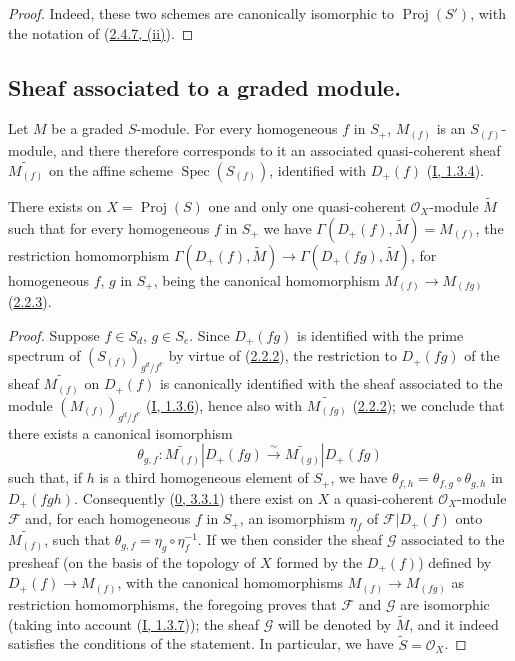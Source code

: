 \begin{proof}
Indeed, these two schemes are canonically isomorphic to
$\operatorname{Proj}(S')$, with the notation of
(\hyperref[II.2.4.7]{2.4.7, (ii)}).
\end{proof}

\subsection{Sheaf associated to a graded module.}
\label{subsection:II.2.5}

\begin{env}[2.5.1]
\label{II.2.5.1}
Let $M$ be a graded $S$-module. For every homogeneous $f$ in $S_+$,
$M_{(f)}$ is an $S_{(f)}$-module, and there therefore corresponds to it an
associated quasi-coherent sheaf $\widetilde{M_{(f)}}$ on the affine scheme
$\operatorname{Spec}(S_{(f)})$, identified with $D_+(f)$
(\hyperref[I.1.3.4]{I, 1.3.4}).
\end{env}

\begin{proposition}[2.5.2]
\label{II.2.5.2}
There exists on $X=\operatorname{Proj}(S)$ one and only one quasi-coherent
$\mathcal{O}_X$-module $\widetilde{M}$ such that for every homogeneous $f$ in
$S_+$ we have
$\Gamma(D_+(f),\widetilde{M})=M_{(f)}$, the restriction homomorphism
$\Gamma(D_+(f),\widetilde{M})\to
\Gamma(D_+(fg),\widetilde{M})$, for homogeneous $f$, $g$ in $S_+$, being
the canonical homomorphism $M_{(f)}\to M_{(fg)}$
(\hyperref[II.2.2.3]{2.2.3}).
\end{proposition}

\begin{proof}
Suppose $f\in S_d$, $g\in S_e$. Since $D_+(fg)$ is identified with the
prime spectrum of $(S_{(f)})_{g^d/f^e}$ by virtue of
(\hyperref[II.2.2.2]{2.2.2}), the restriction to $D_+(fg)$ of the sheaf
$\widetilde{M_{(f)}}$ on $D_+(f)$ is canonically identified with the sheaf
associated to the module $(M_{(f)})_{g^d/f^e}$
(\hyperref[I.1.3.6]{I, 1.3.6}), hence also with
$\widetilde{M_{(fg)}}$ (\hyperref[II.2.2.2]{2.2.2}); we conclude
that there exists a canonical isomorphism
\[
  \theta_{g,f}:\widetilde{M_{(f)}}|D_+(fg)
  \xrightarrow{\sim}\widetilde{M_{(g)}}|D_+(fg)
\]
such that, if $h$ is a third homogeneous element of $S_+$, we have
$\theta_{f,h}=\theta_{f,g}\circ\theta_{g,h}$ in $D_+(fgh)$. Consequently
(\hyperref[0.3.3.1]{0, 3.3.1}) there exist on $X$ a quasi-coherent
$\mathcal{O}_X$-module $\mathcal{F}$ and, for each homogeneous $f$
in $S_+$, an isomorphism $\eta_f$ of
$\mathcal{F}|D_+(f)$ onto $\widetilde{M_{(f)}}$, such that
$\theta_{g,f}=\eta_g\circ\eta_f^{-1}$. If we then consider the sheaf
$\mathcal{G}$ associated to the presheaf (on the basis of the topology of
$X$ formed by the $D_+(f)$) defined by $D_+(f)\to M_{(f)}$, with the
canonical homomorphisms $M_{(f)}\to M_{(fg)}$ as restriction
homomorphisms, the foregoing proves that $\mathcal{F}$ and $\mathcal{G}$
are isomorphic (taking into account (\hyperref[I.1.3.7]{I, 1.3.7})); the
sheaf $\mathcal{G}$ will be denoted by $\widetilde{M}$, and it indeed
satisfies the conditions of the statement. In particular, we have
$\widetilde{S}=\mathcal{O}_X$.
\end{proof}

